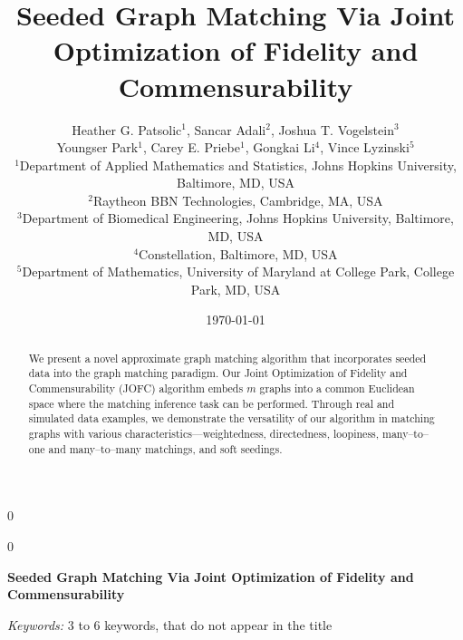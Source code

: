 \documentclass[12pt]{article}
\newcommand{\blind}{0}
\numberwithin{equation}{section}
\theoremstyle{definition}
\begin{document}
%

\def\spacingset#1{\renewcommand{\baselinestretch}%
{#1}\small\normalsize} \spacingset{1}



\blind
{
  \title
  {Seeded Graph Matching Via Joint Optimization of Fidelity and Commensurability}
  \author{Heather G. Patsolic$^{1}$,
      Sancar Adali$^{2}$, Joshua T. Vogelstein$^{3}$\\
      Youngser Park$^{1}$, Carey E. Priebe$^{1}$, 
      Gongkai Li$^{4}$, Vince Lyzinski$^{5}$  \\
  \small{$^{1}$Department of Applied Mathematics and Statistics, Johns Hopkins University, Baltimore, MD, USA}\\
  \small{$^{2}$Raytheon BBN Technologies, Cambridge, MA, USA}\\
  \small{$^{3}$Department of Biomedical Engineering, Johns Hopkins University, Baltimore, MD, USA}\\
  \small{$^{4}$Constellation, Baltimore, MD, USA}\\
  \small{$^{5}$Department of Mathematics, University of Maryland
      at College Park, College Park, MD, USA}}
  \date{\today}
  \maketitle
} \fi

\blind
{
  \bigskip
  \bigskip
  \bigskip
  \begin{center}
    {\LARGE\bf Seeded Graph Matching Via Joint Optimization of Fidelity and Commensurability}
\end{center}
  \medskip
} \fi

\bigskip
\begin{abstract}
  We present a novel approximate graph matching algorithm that incorporates seeded data into the graph matching paradigm.  Our Joint Optimization of Fidelity and Commensurability (JOFC) algorithm embeds $m$ graphs into a common Euclidean space where the matching inference task can be performed.  Through real and simulated data examples, we demonstrate the versatility of our algorithm in matching graphs with various characteristics---weightedness, directedness, loopiness, many--to--one and many--to--many matchings, and soft seedings.
\end{abstract}

\noindent%
{\it Keywords:}  3 to 6 keywords, that do not appear in the title
\vfill
\end{document}
